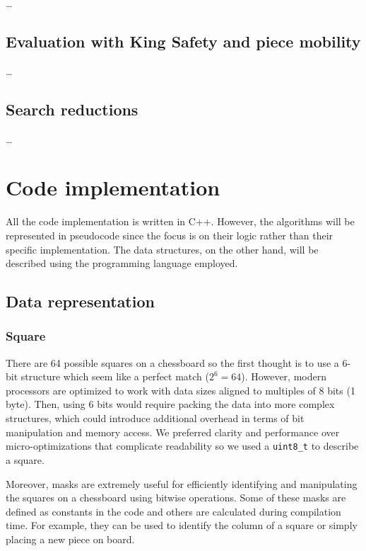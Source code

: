\ldots

\subsection{Evaluation with King Safety and piece mobility}

\ldots

\subsection{Search reductions}

\ldots

\section{Code implementation}
\label{sec:code}

All the code implementation is written in C++. However, the algorithms will be represented in pseudocode since the focus is on their logic rather than their specific implementation. The data structures, on the other hand, will be described using the programming language employed.

\subsection{Data representation}

\subsubsection{Square}

There are 64 possible squares on a chessboard so the first thought is to use a 6-bit structure which seem like a perfect match ($2^6 = 64$). However, modern processors are optimized to work with data sizes aligned to multiples of 8 bits (1 byte). Then, using 6 bits would require packing the data into more complex structures, which could introduce additional overhead in terms of bit manipulation and memory access. We preferred clarity and performance over micro-optimizations that complicate readability so we used a \texttt{uint8\_t} to describe a square.

\vspace{1em}

\noindent Moreover, masks are extremely useful for efficiently identifying and manipulating the squares on a chessboard using bitwise operations. Some of these masks are defined as constants in the code and others are calculated during compilation time. For example, they can be used to identify the column of a square or simply placing a new piece on board.

